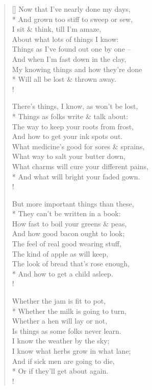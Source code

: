 \documentclass[MAIN]{subfiles}
\begin{document}
\settowidth{\versewidth}{\vin And grown too stiff to sweep or sew,}
\begin{verse}[\versewidth]
Now that I've nearly done my days,\\*
\vin And grown too stiff to sweep or sew,\\
I sit \& think, till I'm amaze,\\
\vin About what lots of things I know:\\
Things as I've found out one by one --\\
\vin And when I’m fast down in the clay,\\
My knowing things and how they're done\\*
\vin Will all be lost \& thrown away.\\!

There's things, I know, as won't be lost,\\*
\vin Things as folks write \& talk about:\\
The way to keep your roots from frost,\\
\vin And how to get your ink spots out.\\
What medicine's good for sores \& sprains,\\
\vin What way to salt your butter down,\\
What charms will cure your different pains,\\*
\vin And what will bright your faded gown.\\!

But more important things than these,\\*
\vin They can't be written in a book:\\
How fast to boil your greens \& peas,\\
\vin And how good bacon ought to look;\\
The feel of real good wearing stuff,\\
\vin The kind of apple as will keep,\\
The look of bread that's rose enough,\\*
\vin And how to get a child asleep.\\!

Whether the jam is fit to pot,\\*
\vin Whether the milk is going to turn,\\
Whether a hen will lay or not,\\
\vin Is things as some folks never learn.\\
I know the weather by the sky;\\
\vin I know what herbs grow in what lane;\\
And if sick men are going to die,\\*
\vin Or if they'll get about again.\\!


\end{verse}
\end{document}
